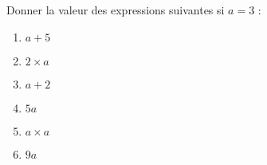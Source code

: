 
\begin{exercice}\label{exosmath-0935}

    Donner la valeur des expressions suivantes si \( a=3\) :
    \begin{multicols}{3}
        \begin{enumerate}
            \item
                \( a+5\)
            \item
                \( 2\times a\)
            \item
                \( a+2\)
            \item
                \( 5a\)
            \item
                \( a\times a\)
            \item
                \( 9a\)
        \end{enumerate}
    \end{multicols}

\end{exercice}
